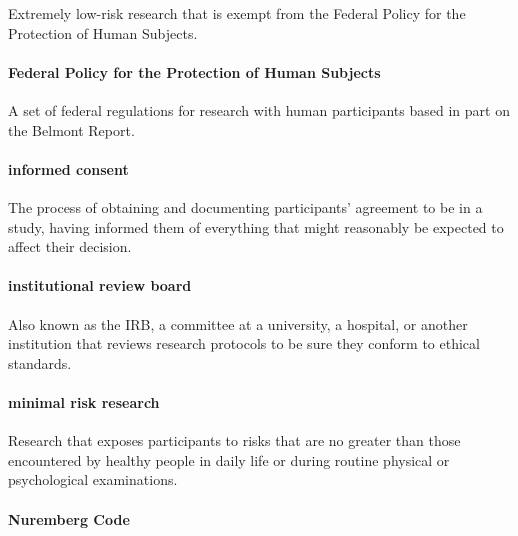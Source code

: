 \documentclass[
]{krantz}
\begin{document}
Extremely low-risk research that is exempt from the Federal Policy for the Protection of Human Subjects.

\paragraph*{Federal Policy for the Protection of Human Subjects}\label{federal-policy-for-the-protection-of-human-subjects}

A set of federal regulations for research with human participants based in part on the Belmont Report.

\paragraph*{informed consent}\label{informed-consent-1}

The process of obtaining and documenting participants' agreement to be in a study, having informed them of everything that might reasonably be expected to affect their decision.

\paragraph*{institutional review board}\label{institutional-review-board}

Also known as the IRB, a committee at a university, a hospital, or another institution that reviews research protocols to be sure they conform to ethical standards.

\paragraph*{minimal risk research}\label{minimal-risk-research}

Research that exposes participants to risks that are no greater than those encountered by healthy people in daily life or during routine physical or psychological examinations.

\paragraph*{Nuremberg Code}\label{nuremberg-code}
\end{document}
